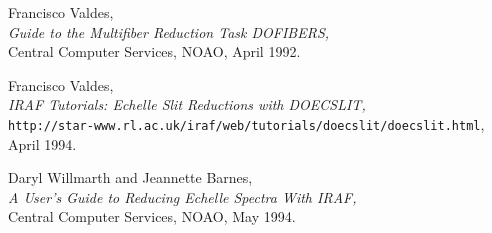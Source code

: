 \documentclass[twoside,11pt]{article}
\newcommand{\htmladdnormallink}[2]{#1}
\begin{document}
\begin{thebibliography}{999}
 Francisco Valdes,\\
      {\sl Guide to the Multifiber Reduction Task DOFIBERS,}\\
      Central Computer Services, NOAO, April 1992.

 Francisco Valdes,\\
      {\sl
      \htmladdnormallink{IRAF Tutorials: Echelle Slit Reductions with DOECSLIT}
      {http://star-www.rl.ac.uk/iraf/web/tutorials/doecslit/doecslit.html},}\\
      {\tt http://star-www.rl.ac.uk/iraf/web/tutorials/doecslit/doecslit.html},
      \\
      April 1994.

 Daryl Willmarth and Jeannette Barnes,\\
      {\sl
      \htmladdnormallink{A User's Guide to Reducing Echelle Spectra With IRAF}
      {file://iraf.noao.edu/iraf/docs/ech.ps.Z},}\\
      Central Computer Services, NOAO, May 1994.

\end{thebibliography}
\end{document}
